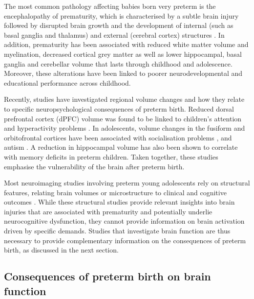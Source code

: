 The most common pathology affecting babies born very preterm is the encephalopathy of prematurity, which is characterised by a subtle brain injury followed by disrupted brain growth and the development of internal (such as basal ganglia and thalamus) and external (cerebral cortex) structures \citep{Kunz2014}. In addition, prematurity has been associated with reduced white matter volume and myelination, decreased cortical grey matter as well as lower hippocampal, basal ganglia and cerebellar volume that lasts through childhood and adolescence. Moreover, these alterations have been linked to poorer neurodevelopmental \citep{Inder2005,Ment2009,Nosarti2013,Padilla2015} and educational \citep{Cheong2013} performance across childhood.

 Recently, studies have investigated regional volume changes and how they relate to specific neuropsychological consequences of preterm birth. Reduced dorsal prefrontal cortex (dPFC) volume was found to be linked to children's attention and hyperactivity problems \citep{Bora2014}. In adolescents, volume changes in the fusiform and orbitofrontal cortices have been associated with socialisation problems \citep{Healy2013}, and autism \citep{Johnson2014}. A reduction in hippocampal volume has also been shown to correlate with memory deficits in preterm children. Taken together, these studies emphasise the vulnerability of the brain after preterm birth.

Most neuroimaging studies involving preterm young adolescents rely on structural features, relating brain volumes or microstructure to clinical and cognitive outcomes \citep{Huning2018, Groeschel2019, Boardman2020}. While these structural studies provide relevant insights into brain injuries that are associated with prematurity and potentially underlie neurocognitive dysfunction, they cannot provide information on brain activation driven by specific demands. Studies that investigate brain function are thus necessary to provide complementary information on the consequences of preterm birth, as discussed in the next section.




\subsection{Consequences of preterm birth on brain function}



